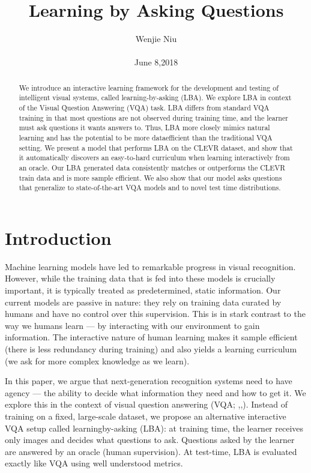 \documentclass[10pt,twocolumn,letterpaper]{article}
\begin{document}
\title{Learning by Asking Questions}

\author{Wenjie Niu\\\\ June 8,2018}

\maketitle

\begin{abstract}
  \cite{Misra_2018_CVPR}We introduce an interactive learning framework for the
development and testing of intelligent visual systems, called
learning-by-asking (LBA). We explore LBA in context of the
Visual Question Answering (VQA) task. LBA differs from
standard VQA training in that most questions are not observed
during training time, and the learner must ask questions
it wants answers to. Thus, LBA more closely mimics
natural learning and has the potential to be more dataefficient
than the traditional VQA setting. We present a
model that performs LBA on the CLEVR dataset, and show
that it automatically discovers an easy-to-hard curriculum
when learning interactively from an oracle. Our LBA generated
data consistently matches or outperforms the CLEVR
train data and is more sample efficient. We also show that
our model asks questions that generalize to state-of-the-art
VQA models and to novel test time distributions.\par
\end{abstract}

\section{Introduction}
Machine learning models have led to remarkable
progress in visual recognition. However, while the training
data that is fed into these models is crucially important,
it is typically treated as predetermined, static information.
Our current models are passive in nature: they rely on training
data curated by humans and have no control over this
supervision. This is in stark contrast to the way we humans
learn — by interacting with our environment to gain information.
The interactive nature of human learning makes
it sample efficient (there is less redundancy during training)
and also yields a learning curriculum (we ask for more complex
knowledge as we learn).\par
In this paper, we argue that next-generation recognition
systems need to have agency — the ability to decide what
information they need and how to get it. We explore this in
the context of visual question answering (VQA; \cite{Stanislaw_2015_CVPR},\cite{Justin_2017_CVPR},\cite{Yuke_2016_CVPR}).
Instead of training on a fixed, large-scale dataset, we propose
an alternative interactive VQA setup called learningby-asking
(LBA): at training time, the learner receives only images and decides what questions to ask. Questions asked
by the learner are answered by an oracle (human supervision).
At test-time, LBA is evaluated exactly like VQA using
well understood metrics.
\end{document}
